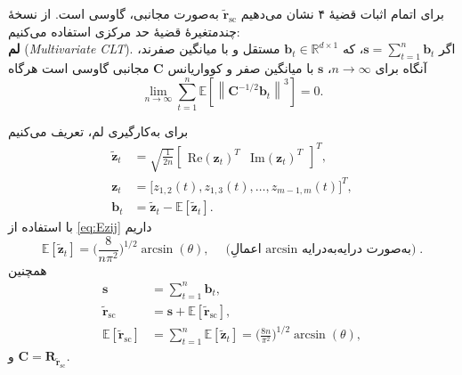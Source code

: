 \begin{اثبات}
	برای اتمام اثبات قضیهٔ ۴ نشان می‌دهیم \(\tilde{\mathbf{r}}_{\mathrm{sc}}\) به‌صورت مجانبی، گاوسی است. از نسخهٔ چندمتغیرهٔ قضیۀ حد مرکزی استفاده می‌کنیم: \\
	\textbf{لم} (\emph{Multivariate CLT}).
	اگر \(\mathbf{s}=\sum_{t=1}^{n}\mathbf{b}_{t}\)، که \(\mathbf{b}_{t}\in\mathbb{R}^{d\times 1}\) مستقل و با میانگین صفرند، آنگاه برای \(n\to\infty\)، \(\mathbf{s}\) با میانگین صفر و کوواریانس \(\mathbf{C}\) مجانبی گاوسی است هرگاه
	\begin{equation}
		\lim_{n\to\infty}\sum_{t=1}^{n}\mathbb{E}\!\left[\left\lVert \mathbf{C}^{-1/2}\mathbf{b}_{t}\right\rVert^{3}\right]=0. 
	\end{equation}
	
	برای به‌کارگیری لم، تعریف می‌کنیم
	\begin{align}
		\tilde{\mathbf{z}}_{t}&=\sqrt{\frac{1}{2n}}
		\begin{bmatrix}
			\mathrm{Re}(\mathbf{z}_{t})^{T} & \mathrm{Im}(\mathbf{z}_{t})^{T}
		\end{bmatrix}^{T}, \\
		\mathbf{z}_{t}&=\big[z_{1,2}(t), z_{1,3}(t),\ldots,z_{m-1,m}(t)\big]^{T},\\
		\mathbf{b}_{t}&=\tilde{\mathbf{z}}_{t}-\mathbb{E}[\tilde{\mathbf{z}}_{t}].
	\end{align}
	با استفاده از \eqref{eq:Ezij} داریم
	\begin{equation}
		\mathbb{E}[\tilde{\mathbf{z}}_{t}]=\Big(\frac{8}{n\pi^{2}}\Big)^{\!1/2}\!\arcsin(\theta),
		\quad\text{(اعمالِ \(\arcsin\) به‌صورت درایه‌به‌درایه)}.
	\end{equation}
	همچنین
	\begin{align}
		\mathbf{s}&=\sum_{t=1}^{n}\mathbf{b}_{t}, \\
		\tilde{\mathbf{r}}_{\mathrm{sc}}&=\mathbf{s}+\mathbb{E}[\tilde{\mathbf{r}}_{\mathrm{sc}}], \\
		\mathbb{E}[\tilde{\mathbf{r}}_{\mathrm{sc}}]&=\sum_{t=1}^{n}\mathbb{E}[\tilde{\mathbf{z}}_{t}]
		=\Big(\frac{8n}{\pi^{2}}\Big)^{\!1/2}\!\arcsin(\theta),
	\end{align}
	و \(\mathbf{C}=\mathbf{R}_{\tilde{\mathbf{r}}_{\mathrm{sc}}}\).
	

\end{اثبات}

